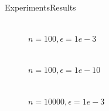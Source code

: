\documentclass{beamer}
\begin{document}
\begin{frame}{Experiments}{Results}
\begin{figure}[H]
\begin{minipage}[h]{0.47\linewidth}
 \\$n=100, \epsilon=1e-3$ \\
\end{minipage}
\hfill
\begin{minipage}[h]{0.47\linewidth}
 \\$n=100, \epsilon=1e-10$
\end{minipage}
\vfill
\begin{minipage}[h]{0.47\linewidth}
 \\$n=10000, \epsilon=1e-3$ \\

\end{minipage}
\end{figure}
\end{frame}
\end{document}
